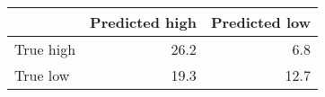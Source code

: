 \begin{tabular}{lrr}
\hline
           &   Predicted high &   Predicted low \\
\hline
 True high &             26.2 &             6.8 \\
 True low  &             19.3 &            12.7 \\
\hline
\end{tabular}